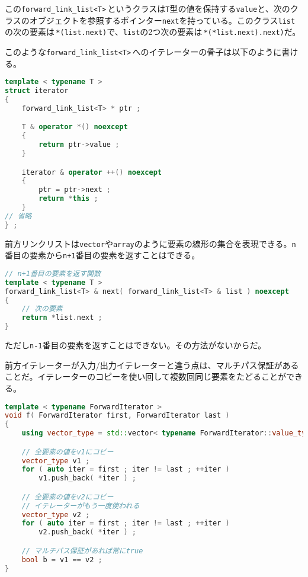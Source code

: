 この\texttt{forward\_link\_list<T>}\,というクラスは\texttt{T}型の値を保持する\texttt{value}と、次のクラスのオブジェクトを参照するポインター\texttt{next}を持っている。このクラス\texttt{list}の次の要素は\,\texttt{*(list.next)}で、\texttt{list}の2つ次の要素は\,\texttt{*(*list.next).next)}だ。

このような\texttt{forward\_link\_list<T>}\,へのイテレーターの骨子は以下のように書ける。

\begin{lstlisting}[language={C++}]
template < typename T >
struct iterator 
{
    forward_link_list<T> * ptr ;

    T & operator *() noexcept
    {
        return ptr->value ;
    }

    iterator & operator ++() noexcept
    {
        ptr = ptr->next ;
        return *this ;
    }
// 省略
} ;
\end{lstlisting}

前方リンクリストは\texttt{vector}や\texttt{array}のように要素の線形の集合を表現できる。\texttt{n}番目の要素から\texttt{n+1}番目の要素を返すことはできる。

\begin{lstlisting}[language={C++}]
// n+1番目の要素を返す関数
template < typename T >
forward_link_list<T> & next( forward_link_list<T> & list ) noexcept
{
    // 次の要素
    return *list.next ;
}
\end{lstlisting}

ただし\texttt{n-1}番目の要素を返すことはできない。その方法がないからだ。

前方イテレーターが入力/出力イテレーターと違う点は、マルチパス保証があることだ。イテレーターのコピーを使い回して複数回同じ要素をたどることができる。

\begin{lstlisting}[language={C++}]
template < typename ForwardIterator >
void f( ForwardIterator first, ForwardIterator last )
{
    using vector_type = std::vector< typename ForwardIterator::value_type > ;

    // 全要素の値をv1にコピー
    vector_type v1 ;
    for ( auto iter = first ; iter != last ; ++iter )
        v1.push_back( *iter ) ;

    // 全要素の値をv2にコピー
    // イテレーターがもう一度使われる
    vector_type v2 ;
    for ( auto iter = first ; iter != last ; ++iter )
        v2.push_back( *iter ) ;

    // マルチパス保証があれば常にtrue
    bool b = v1 == v2 ;
}
\end{lstlisting}

